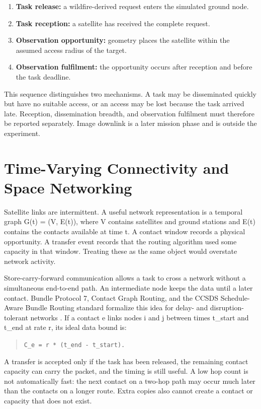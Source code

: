 \begin{enumerate}
\item \textbf{Task release:} a wildfire-derived request enters the simulated ground node.
\item \textbf{Task reception:} a satellite has received the complete request.
\item \textbf{Observation opportunity:} geometry places the satellite within the assumed access radius of the target.
\item \textbf{Observation fulfilment:} the opportunity occurs after reception and before the task deadline.
\end{enumerate}
This sequence distinguishes two mechanisms. A task may be disseminated quickly but have no suitable access, or an access may be lost because the task arrived late. Reception, dissemination breadth, and observation fulfilment must therefore be reported separately. Image downlink is a later mission phase and is outside the experiment.

\section{Time-Varying Connectivity and Space Networking}
Satellite links are intermittent. A useful network representation is a temporal graph G(t) = (V, E(t)), where V contains satellites and ground stations and E(t) contains the contacts available at time t. A contact window records a physical opportunity. A transfer event records that the routing algorithm used some capacity in that window. Treating these as the same object would overstate network activity.

Store-carry-forward communication allows a task to cross a network without a simultaneous end-to-end path. An intermediate node keeps the data until a later contact. Bundle Protocol 7, Contact Graph Routing, and the CCSDS Schedule-Aware Bundle Routing standard formalize this idea for delay- and disruption-tolerant networks \citep{Burleigh2022,Araniti2015,CCSDS2019}. If a contact e links nodes i and j between times t\_start and t\_end at rate r, its ideal data bound is:

\begin{quote}\texttt{C\_e = r * (t\_end - t\_start).}\end{quote}
A transfer is accepted only if the task has been released, the remaining contact capacity can carry the packet, and the timing is still useful. A low hop count is not automatically fast: the next contact on a two-hop path may occur much later than the contacts on a longer route. Extra copies also cannot create a contact or capacity that does not exist.

